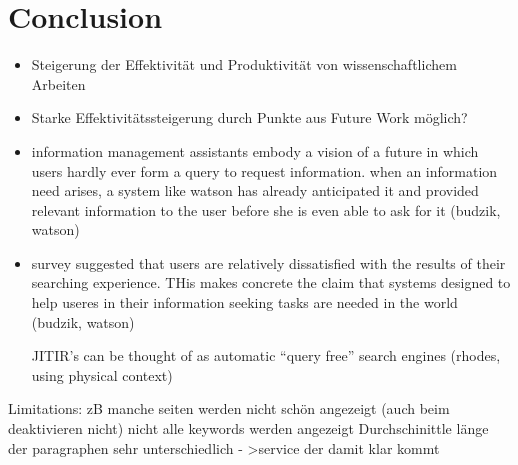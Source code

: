 \section{Conclusion}
 \begin{itemize}
 		\item Steigerung der Effektivität und Produktivität von wissenschaftlichem Arbeiten
 		\item Starke Effektivitätssteigerung durch Punkte aus Future Work möglich?
 		\item information management assistants embody a vision of a future in which users hardly ever form a query to request information. when an information need arises, a system like watson has already anticipated it and provided relevant information to the user before she is even able to ask for it (budzik, watson)
 		\item survey suggested that users are relatively dissatisfied with the results of their searching experience. THis makes concrete the claim that systems designed to help useres in their information seeking tasks are needed in the world (budzik, watson)

 		JITIR's can be thought of as automatic ``query free'' search engines (rhodes, using physical context)
 	\end{itemize}

 	Limitations: zB manche seiten werden nicht schön angezeigt (auch beim deaktivieren nicht)
 	nicht alle keywords werden angezeigt
 	Durchschinittle länge der paragraphen sehr unterschiedlich - >service der damit klar kommt